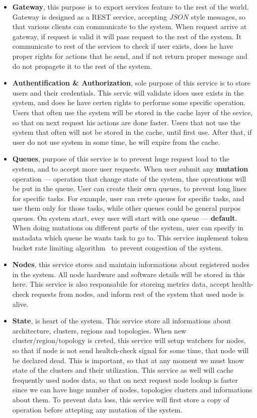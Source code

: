 \begin{itemize}
	\item \textbf{Gateway}, this purpose is to export services feature to the rest of the world. Gateway is designed as a REST service, accepting $JSON$ style messages, so that various clients can communicate to the system. When request arrive at gateway, if request is valid it will pass request to the rest of the system. It communicate to rest of the services to check if user exists, does he have proper rights for actions that he send, and if not return proper message and do not propagete it to the rest of the system.
	\item \textbf{Authentification \& Authorization}, sole purpose of this service is to store users and their credentials. This servic will validate idoes user exists in the system, and does he have certen rights to performe some specific operation. Users that often use the system will be stored in the cache layer of the sevice, so that on next request his actions are done faster. Users that not use the system that often will not be stored in the cache, until first use. After that, if user do not use system in some time, he will expire from the cache.
	\item \textbf{Queues}, purpose of this service is to prevent huge request load to the system, and to accept more user requests. When user submit any \textbf{mutation} operation --- operation that change state of the system, thse opreations will be put in the queue. User can create their own queues, to prevent long lines for specific tasks. For example, user can crete queues for specific tasks, and use them only for those tasks, while other queues could be general purpos queues. On system start, evey user will start with one queue --- \textbf{default}. When doing mutations on different parts of the system, user can specify in matadata which queue he wants task to go to. This service implement token bucket rate limiting algorithm~\cite{MathewsKG17} to prevent congestion of the system.
	\item \textbf{Nodes}, this service stores and maintain informations about registered nodes in the system. All node hardware and software details will be stored in this here. This service is also responsabile for storeing metrics data, accept health-check requests from nodes, and inform rest of the system that used node is alive.
	\item \textbf{State}, is heart of the system. This service store all informations about architecture, clusters, regions and topologies. When new cluster/region/topology is creted, this service will setup watchers for nodes, so that if node is not send healtch-check signal for some time, that node will be declared dead. This is important, so that at any moment we must know state of the clusters and their utilization. This service as well will cache frequently used nodes data, so that on next request node lookup is faster since we can have huge number of nodes, topologies clusters and informations about them. To prevent data loss, this service will first store a copy of operation before attepting any mutation of the system.

\end{itemize}
